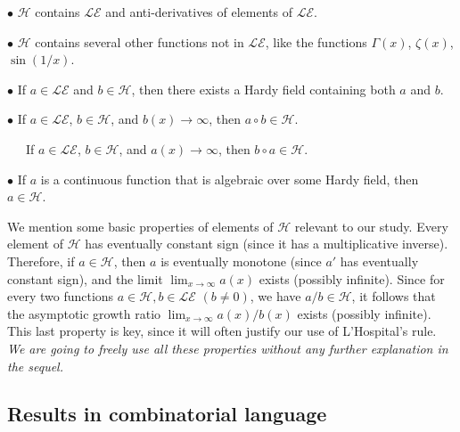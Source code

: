 \documentclass[11pt]{amsart}
\newcommand{\LE}{\mathcal{LE}}
\renewcommand{\H}{\mathcal{H}}
\theoremstyle{plain}
\theoremstyle{definition}
\theoremstyle{remark}
\begin{document}
$\bullet$ $\H$ contains $\LE$ and  anti-derivatives of elements of $\LE$.

$\bullet$ $\H$ contains several other functions not in $\LE$, like the
functions $\Gamma(x)$, $\zeta(x)$,  $\sin{(1/x)}$.

$\bullet$ If $a\in \LE$ and $b\in\H$, then  there exists a Hardy field
containing both $a$ and $b$.

$\bullet$ If $a\in\LE$, $b\in \H$, and $b(x)\to \infty$, then $a\circ
  b\in \H$.

 \ \ \  If $a\in\LE$, $b\in \H$, and $a(x)\to \infty$, then $b\circ a\in \H$.

$\bullet$ If $a$ is a continuous function that is algebraic over some
  Hardy field, then $a\in\H$.


We mention some basic properties of elements of $\H$ relevant to our study. Every element of $\H$ has eventually constant sign
(since it has a multiplicative inverse).
 Therefore, if  $a\in \H$, then $a$ is eventually monotone (since $a'$ has eventually constant sign), and  the limit
$\lim_{x\to \infty} a(x)$ exists (possibly infinite).  Since  for every two
functions $a\in \H, b\in \LE$ $(b\neq 0)$, we have $a/b\in \H$, it follows that   the asymptotic growth ratio
$\lim_{x\to \infty}a(x)/b(x)$ exists (possibly infinite). This last property is key,
since it will often justify our use of  L'Hospital's rule.
\emph{We are going to freely use all these properties without any further explanation in the sequel.}


\subsection{Results in combinatorial language}
\end{document}
